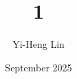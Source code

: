 \documentclass{article}
\title{1}
\author{Yi-Heng Lin}
\date{September 2025}
\begin{document}
\begin{figure}[h]
    
\end{figure}
\end{document}
